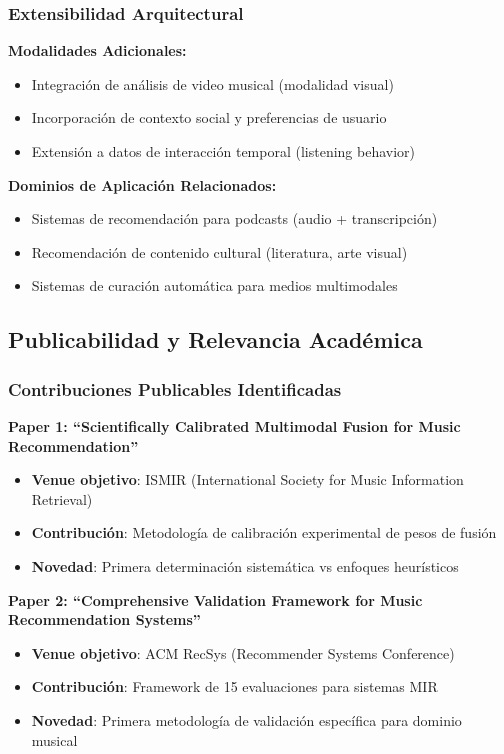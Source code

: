\documentclass[12pt,a4paper]{report}
\begin{document}
\subsubsection{Extensibilidad Arquitectural}

\textbf{Modalidades Adicionales:}
\begin{itemize}
    \item Integración de análisis de video musical (modalidad visual)
    \item Incorporación de contexto social y preferencias de usuario
    \item Extensión a datos de interacción temporal (listening behavior)
\end{itemize}

\textbf{Dominios de Aplicación Relacionados:}
\begin{itemize}
    \item Sistemas de recomendación para podcasts (audio + transcripción)
    \item Recomendación de contenido cultural (literatura, arte visual)
    \item Sistemas de curación automática para medios multimodales
\end{itemize}

\subsection{Publicabilidad y Relevancia Académica}

\subsubsection{Contribuciones Publicables Identificadas}

\textbf{Paper 1: ``Scientifically Calibrated Multimodal Fusion for Music Recommendation''}
\begin{itemize}
    \item \textbf{Venue objetivo}: ISMIR (International Society for Music Information Retrieval)
    \item \textbf{Contribución}: Metodología de calibración experimental de pesos de fusión
    \item \textbf{Novedad}: Primera determinación sistemática vs enfoques heurísticos
\end{itemize}

\textbf{Paper 2: ``Comprehensive Validation Framework for Music Recommendation Systems''}
\begin{itemize}
    \item \textbf{Venue objetivo}: ACM RecSys (Recommender Systems Conference)
    \item \textbf{Contribución}: Framework de 15 evaluaciones para sistemas MIR
    \item \textbf{Novedad}: Primera metodología de validación específica para dominio musical
\end{itemize}
\end{document}

